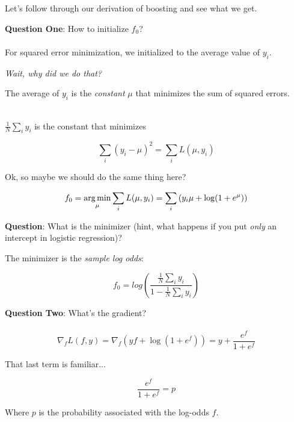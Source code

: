 \begin{frame}
Let's follow through our derivation of boosting and see what we get.
\end{frame}
%
\begin{frame}
\textbf{Question One}: How to initialize $f_0$?\\~\\

For squared error minimization, we initialized to the average value of $y_i$.

\begin{center}
\textit{Wait, why did we do that?}
\end{center}

\end{frame}
%
\begin{frame}
The average of $y_i$ is the \textit{constant} $\mu$ that minimizes the sum of squared errors.\\~\\

\begin{center}
    $\frac{1}{N} \sum_i y_i$ is the constant that minimizes
\end{center}

$$ \sum_i \left( y_i - \mu \right)^2 = \sum_i L(\mu, y_i) $$
\end{frame}
%
\begin{frame}
Ok, so maybe we should do the same thing here?

$$ f_0 = \operatorname*{arg\,min}_{\mu} \sum_i L(\mu, y_i) = \sum_i \left( y_i \mu + \log(1 + e^{\mu}) \right) $$

\textbf{Question}: What is the minimizer (hint, what happens if you put \textit{only} an intercept in logistic regression)?

\end{frame}
%
\begin{frame}
The minimizer is the \textit{sample log odds}:

$$ f_0 = log \left( \frac{\frac{1}{N}\sum_i y_i}{1 - \frac{1}{N}\sum_i y_i } \right) $$ 
\end{frame}
%
\begin{frame}
\textbf{Question Two}: What's the gradient?\\~\\

$$ \nabla_f L(f, y) = \nabla_f \left( y f + \log(1 + e^f) \right) = y + \frac{e^f}{1 + e^f} $$

That last term is familiar...

$$ \frac{e^f}{1 + e^f} = p$$

Where $p$ is the probability associated with the log-odds $f$.
\end{frame}

